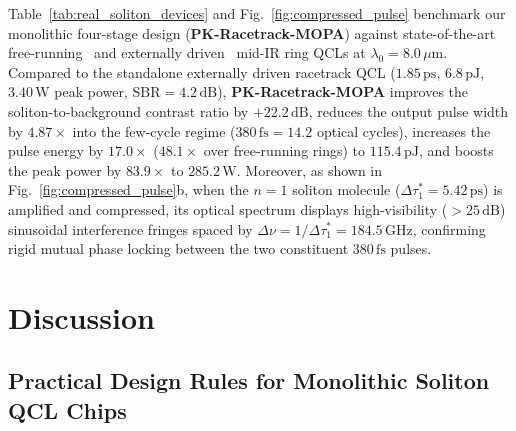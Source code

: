 \documentclass[11pt,letterpaper]{article}
\begin{document}
Table~\ref{tab:real_soliton_devices} and Fig.~\ref{fig:compressed_pulse} benchmark our monolithic four-stage design (\textbf{PK-Racetrack-MOPA}) against state-of-the-art free-running~\cite{Piccardo2020,Meng2022} and externally driven~\cite{Kazakov2025,ColumboRoadmap2025} mid-IR ring QCLs at $\lambda_0 = 8.0\,\mu\mathrm{m}$. Compared to the standalone externally driven racetrack QCL ($1.85\,\mathrm{ps}$, $6.8\,\mathrm{pJ}$, $3.40\,\mathrm{W}$ peak power, $\mathrm{SBR} = 4.2\,\mathrm{dB}$), \textbf{PK-Racetrack-MOPA} improves the soliton-to-background contrast ratio by $+22.2\,\mathrm{dB}$, reduces the output pulse width by $4.87\times$ into the few-cycle regime ($380\,\mathrm{fs} = 14.2$ optical cycles), increases the pulse energy by $17.0\times$ ($48.1\times$ over free-running rings) to $115.4\,\mathrm{pJ}$, and boosts the peak power by $83.9\times$ to $285.2\,\mathrm{W}$. Moreover, as shown in Fig.~\ref{fig:compressed_pulse}b, when the $n = 1$ soliton molecule ($\Delta\tau_1^* = 5.42\,\mathrm{ps}$) is amplified and compressed, its optical spectrum displays high-visibility ($>25\,\mathrm{dB}$) sinusoidal interference fringes spaced by $\Delta\nu = 1/\Delta\tau_1^* = 184.5\,\mathrm{GHz}$, confirming rigid mutual phase locking between the two constituent $380\,\mathrm{fs}$ pulses.

\section{Discussion}
\label{sec:discussion}

\subsection{Practical Design Rules for Monolithic Soliton QCL Chips}
\label{subsec:design_rules}
\end{document}
